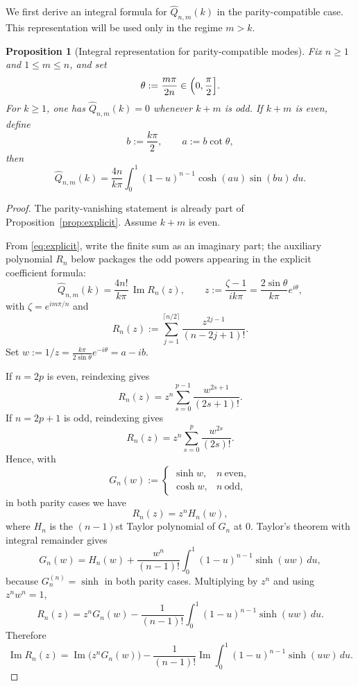 \documentclass[a4paper,12pt]{amsart}
\newtheorem{proposition}[theorem]{Proposition}
\theoremstyle{definition}
\theoremstyle{remark}
\DeclareMathOperator{\ImagPart}{Im}
\renewcommand{\Im}{\ImagPart}
\begin{document}
We first derive an integral formula for $\widehat Q_{n,m}(k)$ in the parity-compatible case. This representation will be used only in the regime $m > k$.
\begin{proposition}[Integral representation for parity-compatible modes]\label{prop:integral-representation}
Fix $n\ge1$ and $1\le m\le n$, and set
\[
\theta:=\frac{m\pi}{2n}\in\Bigl(0,\frac{\pi}{2}\Bigr].
\]
For $k\ge1$, one has $\widehat Q_{n,m}(k)=0$ whenever $k+m$ is odd.
If $k+m$ is even, define
\[
b:=\frac{k\pi}{2},\qquad a:=b\cot\theta,
\]
then
\begin{equation}\label{eq:integral-rep}
\widehat Q_{n,m}(k)=
\frac{4n}{k\pi}\int_0^1 (1-u)^{n-1}\cosh(au)\sin(bu)\,du.
\end{equation}
\end{proposition}

\begin{proof}
The parity-vanishing statement is already part of
Proposition~\ref{prop:explicit}. Assume $k+m$ is even.

From \eqref{eq:explicit}, write the finite sum as an imaginary part; the auxiliary polynomial $R_n$ below packages the odd powers appearing in the explicit coefficient formula:
\begin{equation}
\label{eq:compact-pn}
\widehat Q_{n,m}(k)=\frac{4n!}{k\pi}\,\Im R_n(z),
\qquad
z:=\frac{\zeta-1}{ik\pi}
=\frac{2\sin\theta}{k\pi}e^{i\theta},
\end{equation}
with $\zeta=e^{im\pi/n}$ and
\[
R_n(z):=\sum_{j=1}^{\lceil n/2\rceil}\frac{z^{2j-1}}{(n-2j+1)!}.
\]
Set $w:=1/z=\frac{k\pi}{2\sin\theta}e^{-i\theta}=a-ib$.

If $n=2p$ is even, reindexing gives
\[
R_n(z)=z^n\sum_{s=0}^{p-1}\frac{w^{2s+1}}{(2s+1)!}.
\]
If $n=2p+1$ is odd, reindexing gives
\[
R_n(z)=z^n\sum_{s=0}^{p}\frac{w^{2s}}{(2s)!}.
\]
Hence, with
\[
G_n(w):=
\begin{cases}
\sinh w,& n\ \text{even},\\
\cosh w,& n\ \text{odd},
\end{cases}
\]
in both parity cases we have
\[
R_n(z)=z^nH_n(w),
\]
where $H_n$ is the $(n-1)$st Taylor polynomial of $G_n$ at $0$.
Taylor's theorem with integral remainder gives
\[
G_n(w) = H_n(w)+\frac{w^n}{(n-1)!}\int_0^1(1-u)^{n-1}\sinh(uw)\,du,
\]
because $G_n^{(n)}=\sinh$ in both parity cases.
Multiplying by $z^n$ and using $z^n w^n=1$,
\[
R_n(z) = z^nG_n(w)-\frac{1}{(n-1)!}\int_0^1(1-u)^{n-1}\sinh(uw)\,du.
\]
Therefore
\begin{equation}\label{eq:im-split}
\Im R_n(z)=\Im\!\bigl(z^nG_n(w)\bigr)
-\frac{1}{(n-1)!}\Im\!\int_0^1(1-u)^{n-1}\sinh(uw)\,du.
\end{equation}




\end{proof}
\end{document}
